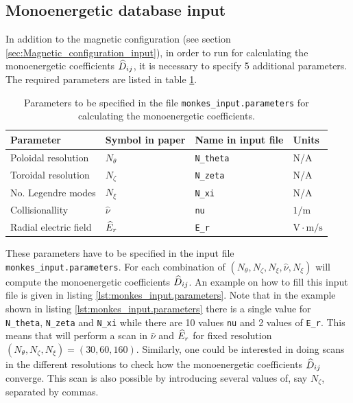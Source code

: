 \subsection{Monoenergetic database input}\FloatBarrier
In addition to the magnetic configuration (see section \ref{sec:Magnetic_configuration_input}), in order to run {\MONKES} for calculating the monoenergetic coefficients $\widehat{D}_{ij}$, it is necessary to specify 5 additional parameters. The required parameters are listed in table \ref{tab:monkes_input.parameters}.

\begin{table}[]
	\centering
	\begin{tabular}{@{}llll@{}}
		\toprule
		Parameter             & Symbol in {\MONKES} paper \cite{Escoto_2024} & {Name in {\MONKES} input file} & Units           \\ \midrule
		Poloidal resolution   & $N_\theta$                                 & \texttt{N\_theta}                                & N/A             \\
		Toroidal resolution   & $N_\zeta$                                 & \texttt{N\_zeta}                                & N/A             \\
		No. Legendre modes    & $N_\xi$                                    & \texttt{N\_xi}                                   & N/A             \\
		Collisionallity       & $\hat{\nu}$                                & \texttt{nu}                                      & $1/\text{m}$    \\
		Radial electric field & $\widehat{E}_{r}$                                      & \texttt{E\_r}                                    & $\text{V}\cdot \text{m}/\text{s}$ \\ \bottomrule
	\end{tabular}
	\caption{Parameters to be specified in the file \texttt{monkes\_input.parameters} for calculating the monoenergetic coefficients.}
	\label{tab:monkes_input.parameters}
\end{table}

These parameters have to be specified in the input file \texttt{monkes\_input.parameters}. For each combination of $(N_\theta,N_\zeta,N_\xi,\hat{\nu},N_\xi)$ {\MONKES} will compute the monoenergetic coefficients $\widehat{D}_{ij}$. An example on how to fill this input file is given in listing \ref{lst:monkes_input.parameters}. Note that in the example shown in listing \ref{lst:monkes_input.parameters} there is a single value for \texttt{N\_theta}, \texttt{N\_zeta} and \texttt{N\_xi} while there are 10 values \texttt{nu} and 2 values of \texttt{E\_r}. This means that {\MONKES} will perform a scan in $\hat{\nu}$ and $\widehat{E}_{r}$ for fixed resolution $(N_\theta,N_\zeta,N_\xi)=(30,60,160)$. Similarly, one could be interested in doing scans in the different resolutions to check how the monoenergetic coefficients $\widehat{D}_{ij}$ converge. This scan is also possible by introducing several values of, say $N_\zeta$, separated by commas. 

